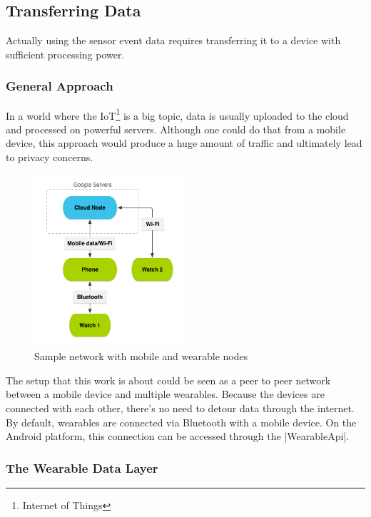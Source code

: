 \subsection{Transferring Data}
\label{sec:implementation:transferringdata}
Actually using the sensor event data requires transferring it to a device with sufficient processing power.

\subsubsection{General Approach}
In a world where the IoT\footnote{Internet of Things} is a big topic, data is usually uploaded to the cloud and processed on powerful servers.
Although one could do that from a mobile device, this approach would produce a huge amount of traffic and ultimately lead to privacy concerns.

\begin{figure}[H]
	\centering
	\includegraphics[width=0.5\textwidth]{images/wear_cloud_node.png}
	\caption[Caption for wear_cloud_node]{Sample network with mobile and wearable nodes\footnotemark}
	\label{fig:nodeNetwork}
\end{figure}

The setup that this work is about could be seen as a peer to peer network between a mobile device and multiple wearables.
Because the devices are connected with each other, there's no need to detour data through the internet.
By default, wearables are connected via Bluetooth with a mobile device.
On the Android platform, this connection can be accessed through the |WearableApi|\cite{androiddocs:wearable}.

\clearpage

\subsubsection{The Wearable Data Layer}


